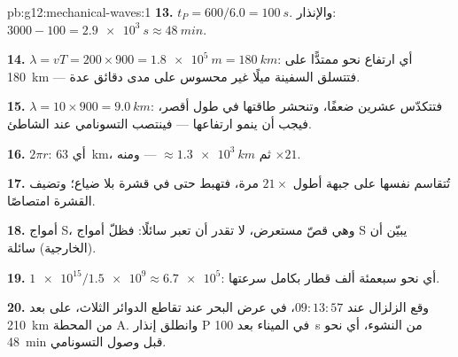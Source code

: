 \begin{solution}{pb:g12:mechanical-waves:1}
\textbf{13.} $t_P = 600/6.0 = \qty{100}{s}$. والإنذار:
$3000 - 100 = \qty{2.9e3}{s} \approx \qty{48}{min}$.

\textbf{14.} $\lambda = vT = 200 \times 900 = \qty{1.8e5}{m} =
\qty{180}{km}$: أي ارتفاع نحو  ممتدًّا على \qty{180}{km} ---
فتتسلق السفينة ميلًا غير محسوس على مدى دقائق عدة.

\textbf{15.} $\lambda = 10 \times 900 = \qty{9.0}{km}$: فتتكدّس 
عشرين ضعفًا، وتنحشر طاقتها في طول أقصر، فيجب أن ينمو
ارتفاعها --- فينتصب التسونامي عند الشاطئ.

\textbf{16.} $2\pi r$: أي \qty{63}{km}، ثم $\approx \qty{1.3e3}{km}$
--- ومنه $\times 21$.

\textbf{17.} تُتقاسم  نفسها على جبهة أطول $21\times$
مرة، فتهبط  حتى في قشرة بلا ضياع؛ وتضيف القشرة 
امتصاصًا.

\textbf{18.} أمواج S، وهي قصّ مستعرض، لا تقدر أن تعبر سائلًا: فظلّ
أمواج S يبيّن أن  (الخارجية) سائلة.

\textbf{19.} $\num{1e15}/\num{1.5e9} \approx \num{6.7e5}$: أي نحو
سبعمئة ألف قطار بكامل سرعتها.

\textbf{20.} وقع الزلزال عند $09{:}13{:}57$، في عرض البحر عند
تقاطع الدوائر الثلاث، على بعد \qty{210}{km} من المحطة A. وانطلق
إنذار  P في الميناء بعد \qty{100}{s} من النشوء، أي نحو
\qty{48}{min} قبل وصول التسونامي.
\end{solution}
